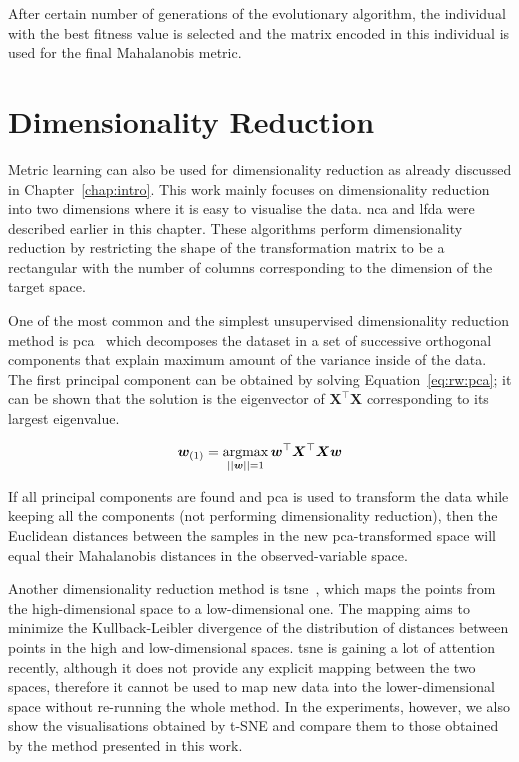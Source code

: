 \documentclass[12pt,a4paper]{report}
\begin{document}
After certain number of generations of the evolutionary algorithm, the individual with the best fitness value is selected and the matrix encoded in this individual is used for the final Mahalanobis metric.

\section{Dimensionality Reduction}

Metric learning can also be used for dimensionality reduction as already discussed in Chapter~\ref{chap:intro}. This work mainly focuses on dimensionality reduction into two dimensions where it is easy to visualise the data. \Ac{nca} and \ac{lfda} were described earlier in this chapter. These algorithms perform dimensionality reduction by restricting the shape of the transformation matrix to be a rectangular with the number of columns corresponding to the dimension of the target space.

One of the most common and the simplest unsupervised dimensionality reduction method is \ac{pca}~\citep{jolliffe2002principal} which decomposes the dataset in a set of successive orthogonal components that explain maximum amount of the variance inside of the data. The first principal component can be obtained by solving Equation~\ref{eq:rw:pca}; it can be shown that the solution is the eigenvector of $\bm{X}^\top\bm{X}$ corresponding to its largest eigenvalue.

\begin{equation} 
\bm{w}_{(1)} = \operatorname*{argmax}_{||\bm{w}||=1} \bm{w}^\top\bm{X}^\top\bm{X}\bm{w} \label{eq:rw:pca}
\end{equation}

If all principal components are found and \ac{pca} is used to transform the data while keeping all the components (not performing dimensionality reduction), then the Euclidean distances between the samples in the new \ac{pca}-transformed space will equal their Mahalanobis distances in the observed-variable space.

Another dimensionality reduction method is \ac{tsne}~\citep{maaten2008visualizing}, which maps the points from the high-dimensional space to a low-dimensional one. The mapping aims to minimize the Kullback-Leibler divergence of the distribution of distances between points in the high and low-dimensional spaces. \ac{tsne} is gaining a lot of attention recently, although it does not provide any explicit mapping between the two spaces, therefore it cannot be used to map new data into the lower-dimensional space without re-running the whole method. In the experiments, however, we also show the visualisations obtained by t-SNE and compare them to those obtained by the method presented in this work.
\end{document}
